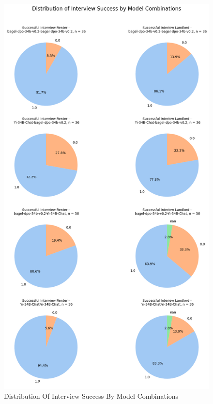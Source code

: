 \documentclass[runningheads]{llncs}
\begin{document}
\begin{figure}[H]
    \centering
    \includegraphics[keepaspectratio=true,scale=0.5]{plots/pieplot_successful_interviews.png}
    \caption[eval]{Distribution Of Interview Success By Model Combinations}
    \label{fig:success_interviews}
\end{figure} 
\end{document}
